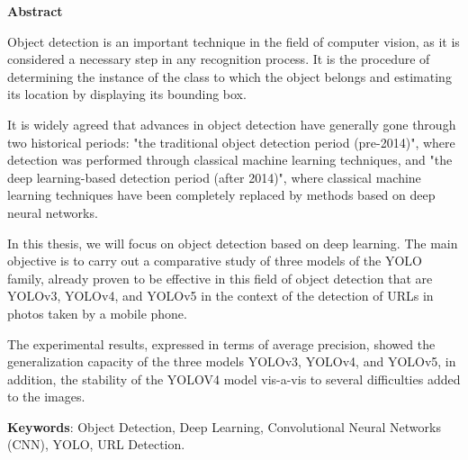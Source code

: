 \newpage
\thispagestyle{empty}
\begin{center}
{\Large \textbf{Abstract}}
\end{center}

Object detection is an important technique in the field of computer vision, as it is considered a necessary step in any recognition process. It is the procedure of determining the instance of the class to which the object belongs and estimating its location by displaying its bounding box.

It is widely agreed that advances in object detection have generally gone through two historical periods: "the traditional object detection period (pre-2014)", where detection was performed through classical machine learning techniques, and "the deep learning-based detection period (after 2014)", where classical machine learning techniques have been completely replaced by methods based on deep neural networks.

In this thesis, we will focus on object detection based on deep learning. The main objective is to carry out a comparative study of three models of the YOLO family, already proven to be effective in this field of object detection that are YOLOv3, YOLOv4, and YOLOv5 in the context of the detection of URLs in photos taken by a mobile phone.

The experimental results, expressed in terms of average precision, showed the generalization capacity of the three models YOLOv3, YOLOv4, and YOLOv5, in addition,  the stability of the YOLOV4 model vis-a-vis to several difficulties added to the images.


\vspace{0.5cm}
\textbf{Keywords}: Object Detection, Deep Learning, Convolutional Neural Networks (CNN), YOLO, URL Detection.
